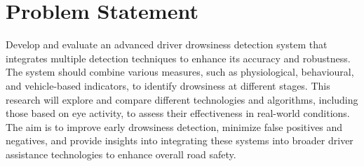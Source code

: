 \documentclass[a4paper,12pt]{report}
\begin{document}
\section{Problem Statement}

Develop and evaluate an advanced driver drowsiness detection system that integrates multiple detection techniques to enhance its accuracy and robustness. The system should combine various measures, such as physiological, behavioural, and vehicle-based indicators, to identify drowsiness at different stages. This research will explore and compare different technologies and algorithms, including those based on eye activity, to assess their effectiveness in real-world conditions. The aim is to improve early drowsiness detection, minimize false positives and negatives, and provide insights into integrating these systems into broader driver assistance technologies to enhance overall road safety.
\end{document}
